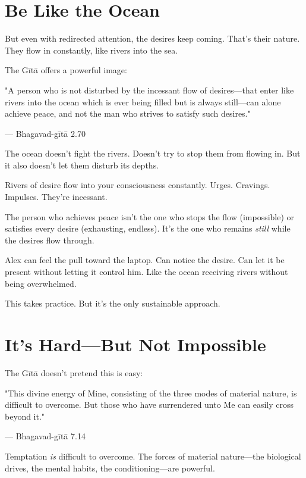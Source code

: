 \documentclass[11pt,twoside]{book}
\begin{document}
\section*{Be Like the Ocean}

But even with redirected attention, the desires keep coming. That's their nature. They flow in constantly, like rivers into the sea.

The Gītā offers a powerful image:

\begin{pullquote}
"A person who is not disturbed by the incessant flow of desires—that enter like rivers into the ocean which is ever being filled but is always still—can alone achieve peace, and not the man who strives to satisfy such desires."

--- Bhagavad-gītā 2.70
\end{pullquote}

The ocean doesn't fight the rivers. Doesn't try to stop them from flowing in. But it also doesn't let them disturb its depths.

Rivers of desire flow into your consciousness constantly. Urges. Cravings. Impulses. They're incessant.

The person who achieves peace isn't the one who stops the flow (impossible) or satisfies every desire (exhausting, endless). It's the one who remains \textit{still} while the desires flow through.

Alex can feel the pull toward the laptop. Can notice the desire. Can let it be present without letting it control him. Like the ocean receiving rivers without being overwhelmed.

This takes practice. But it's the only sustainable approach.

\section*{It's Hard—But Not Impossible}

The Gītā doesn't pretend this is easy:

\begin{pullquote}
"This divine energy of Mine, consisting of the three modes of material nature, is difficult to overcome. But those who have surrendered unto Me can easily cross beyond it."

--- Bhagavad-gītā 7.14
\end{pullquote}

Temptation \textit{is} difficult to overcome. The forces of material nature—the biological drives, the mental habits, the conditioning—are powerful.
\end{document}
